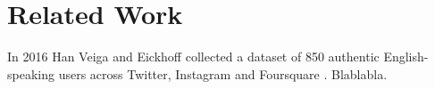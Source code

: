 \chapter{Related Work}\label{ch:rel}

In 2016 Han Veiga and Eickhoff collected a dataset of 850 authentic English-speaking users across Twitter, Instagram and Foursquare \cite{OSN}. Blablabla.